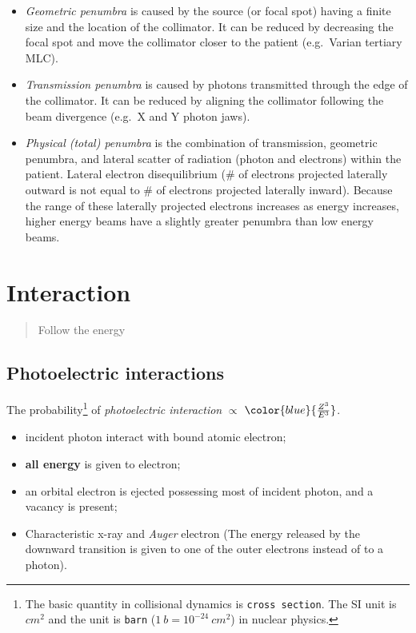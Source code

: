 \documentclass[]{book}
\providecommand{\tightlist}{%
  \setlength{\itemsep}{0pt}\setlength{\parskip}{0pt}}
\let\rmarkdownfootnote\footnote%
\def\footnote{\protect\rmarkdownfootnote}
\theoremstyle{definition}
\theoremstyle{definition}
\theoremstyle{definition}
\theoremstyle{remark}
\begin{document}
\begin{itemize}
\tightlist
\item
  \emph{Geometric penumbra} is caused by the source (or focal spot)
  having a finite size and the location of the collimator. It can be
  reduced by decreasing the focal spot and move the collimator closer to
  the patient (e.g.~Varian tertiary MLC).
\item
  \emph{Transmission penumbra} is caused by photons transmitted through
  the edge of the collimator. It can be reduced by aligning the
  collimator following the beam divergence (e.g.~X and Y photon jaws).
\item
  \emph{Physical (total) penumbra} is the combination of transmission,
  geometric penumbra, and lateral scatter of radiation (photon and
  electrons) within the patient. Lateral electron disequilibrium (\# of
  electrons projected laterally outward is not equal to \# of electrons
  projected laterally inward). Because the range of these laterally
  projected electrons increases as energy increases, higher energy beams
  have a slightly greater penumbra than low energy beams.
\end{itemize}

\chapter{Interaction}\label{inter}

\begin{quote}
Follow the energy
\end{quote}

\section{Photoelectric interactions}\label{photo-el}

The probability\footnote{The basic quantity in collisional dynamics is
  \texttt{cross\ section}. The SI unit is \(cm^2\) and the unit is
  \texttt{barn} (\(1\ b = 10^{-24}\ cm^2\)) in nuclear physics.} of
\emph{photoelectric interaction} \(\propto\)
\(\color{blue} {\frac{Z^3}{E^3}}\).

\begin{itemize}
\tightlist
\item
  incident photon interact with bound atomic electron;
\item
  \textbf{all energy} is given to electron;
\item
  an orbital electron is ejected possessing most of incident photon, and
  a vacancy is present;
\item
  Characteristic x-ray and \emph{Auger} electron (The energy released by
  the downward transition is given to one of the outer electrons instead
  of to a photon).
\end{itemize}
\end{document}
